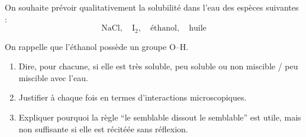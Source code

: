 \documentclass[11pt,a4paper]{article}
\begin{document}
\begin{enoncebox}
On souhaite prévoir qualitativement la solubilité dans l'eau des espèces suivantes :
\[
\mathrm{NaCl},\quad \mathrm{I_2},\quad \text{éthanol},\quad \text{huile}
\]

On rappelle que l'éthanol possède un groupe O--H.

\begin{enumerate}[label=\arabic*)]
    \item Dire, pour chacune, si elle est très soluble, peu soluble ou non miscible / peu miscible avec l'eau.
    \item Justifier à chaque fois en termes d'interactions microscopiques.
    \item Expliquer pourquoi la règle ``le semblable dissout le semblable'' est utile, mais non suffisante si elle est récitéée sans réflexion.
\end{enumerate}
\end{enoncebox}
\end{document}
